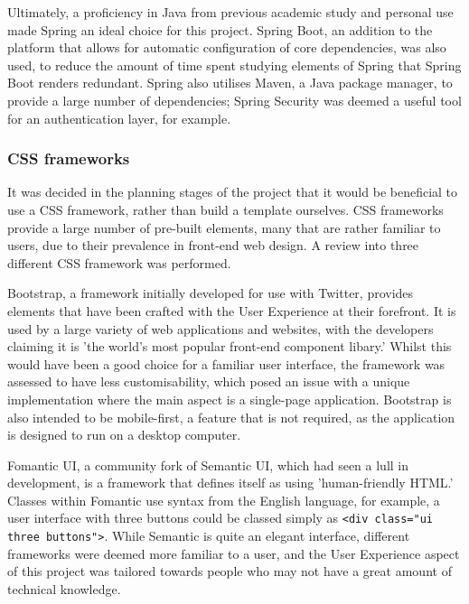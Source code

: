 Ultimately, a proficiency in Java from previous academic study and personal use made Spring an ideal choice for this project. Spring Boot, an addition to the platform that allows for automatic configuration of core dependencies, was also used, to reduce the amount of time spent studying elements of Spring that Spring Boot renders redundant. Spring also utilises Maven, a Java package manager, to provide a large number of dependencies; Spring Security was deemed a useful tool for an authentication layer, for example.

\subsubsection{CSS frameworks}

It was decided in the planning stages of the project that it would be beneficial to use a CSS framework, rather than build a template ourselves. CSS frameworks provide a large number of pre-built elements, many that are rather familiar to users, due to their prevalence in front-end web design. A review into three different CSS framework was performed.

Bootstrap, a framework initially developed for use with Twitter, provides elements that have been crafted with the User Experience at their forefront. It is used by a large variety of web applications and websites, with the developers claiming it is 'the world's most popular front-end component libary.' Whilst this would have been a good choice for a familiar user interface, the framework was assessed to have less customisability, which posed an issue with a unique implementation where the main aspect is a single-page application. Bootstrap is also intended to be mobile-first, a feature that is not required, as the application is designed to run on a desktop computer.

Fomantic UI, a community fork of Semantic UI, which had seen a lull in development, is a framework that defines itself as using 'human-friendly HTML.' Classes within Fomantic use syntax from the English language, for example, a user interface with three buttons could be classed simply as \texttt{<div class="ui three buttons">}. While Semantic is quite an elegant interface, different frameworks were deemed more familiar to a user, and the User Experience aspect of this project was tailored towards people who may not have a great amount of technical knowledge.

